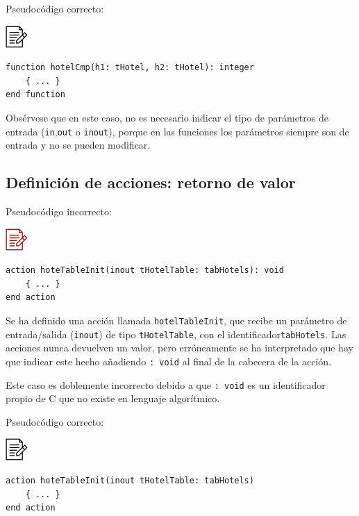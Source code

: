 \documentclass[
]{book}
\begin{document}
Pseudocódigo correcto:

\includegraphics{./img/alg.png}

\begin{verbatim}
function hotelCmp(h1: tHotel, h2: tHotel): integer
    { ... }
end function
\end{verbatim}

Obsérvese que en este caso, no es necesario indicar el tipo de parámetros de entrada (\texttt{in},\texttt{out} o \texttt{inout}), porque en las funciones los parámetros siempre son de entrada y no se pueden modificar.

\hypertarget{definiciuxf3n-de-acciones-retorno-de-valor}{%
\subsection{Definición de acciones: retorno de valor}\label{definiciuxf3n-de-acciones-retorno-de-valor}}

Pseudocódigo incorrecto:

\includegraphics{./img/alg_err.png}

\begin{verbatim}
action hoteTableInit(inout tHotelTable: tabHotels): void
    { ... }
end action
\end{verbatim}

Se ha definido una acción llamada \texttt{hotelTableInit}, que recibe un parámetro de entrada/salida (\texttt{inout}) de tipo \texttt{tHotelTable}, con el identificador\texttt{tabHotels}. Las acciones nunca devuelven un valor, pero erróneamente se ha interpretado que hay que indicar este hecho añadiendo \texttt{:\ void} al final de la cabecera de la acción.

Este caso es doblemente incorrecto debido a que \texttt{:\ void} es un identificador propio de C que no existe en lenguaje algorítmico.

Pseudocódigo correcto:

\includegraphics{./img/alg.png}

\begin{verbatim}
action hoteTableInit(inout tHotelTable: tabHotels)
    { ... }
end action
\end{verbatim}
\end{document}
